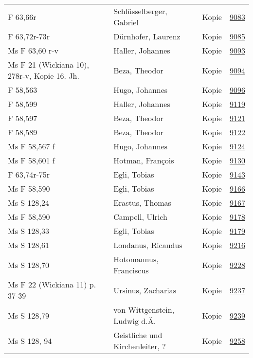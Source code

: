 \documentclass[10pt,a4paper,landscape]{report}
\begin{document}
\begin{longtable}{p{16cm}p{4cm}lr}
F 63,66r	&	Schlüsselberger, Gabriel	&	Kopie	&	\href{http://130.60.24.72/assignment/9083}{9083}\\
F 63,72r-73r	&	Dürnhofer, Laurenz	&	Kopie	&	\href{http://130.60.24.72/assignment/9085}{9085}\\
Ms F 63,60 r-v	&	Haller, Johannes	&	Kopie	&	\href{http://130.60.24.72/assignment/9093}{9093}\\
Ms F 21 (Wickiana 10), 278r-v, Kopie 16. Jh.	&	Beza, Theodor	&	Kopie	&	\href{http://130.60.24.72/assignment/9094}{9094}\\
F 58,563	&	Hugo, Johannes	&	Kopie	&	\href{http://130.60.24.72/assignment/9096}{9096}\\
F 58,599	&	Haller, Johannes	&	Kopie	&	\href{http://130.60.24.72/assignment/9119}{9119}\\
F 58,597	&	Beza, Theodor	&	Kopie	&	\href{http://130.60.24.72/assignment/9121}{9121}\\
F 58,589	&	Beza, Theodor	&	Kopie	&	\href{http://130.60.24.72/assignment/9122}{9122}\\
Ms F 58,567 f	&	Hugo, Johannes	&	Kopie	&	\href{http://130.60.24.72/assignment/9124}{9124}\\
Ms F 58,601 f	&	Hotman, François	&	Kopie	&	\href{http://130.60.24.72/assignment/9130}{9130}\\
F 63,74r-75r	&	Egli, Tobias	&	Kopie	&	\href{http://130.60.24.72/assignment/9143}{9143}\\
Ms F 58,590	&	Egli, Tobias	&	Kopie	&	\href{http://130.60.24.72/assignment/9166}{9166}\\
Ms S 128,24	&	Erastus, Thomas	&	Kopie	&	\href{http://130.60.24.72/assignment/9167}{9167}\\
Ms F 58,590	&	Campell, Ulrich	&	Kopie	&	\href{http://130.60.24.72/assignment/9178}{9178}\\
Ms S 128,33	&	Egli, Tobias	&	Kopie	&	\href{http://130.60.24.72/assignment/9179}{9179}\\
Ms S 128,61	&	Londanus, Ricaudus	&	Kopie	&	\href{http://130.60.24.72/assignment/9216}{9216}\\
Ms S 128,70	&	Hotomannus, Franciscus	&	Kopie	&	\href{http://130.60.24.72/assignment/9228}{9228}\\
Ms F 22 (Wickiana 11) p. 37-39	&	Ursinus, Zacharias	&	Kopie	&	\href{http://130.60.24.72/assignment/9237}{9237}\\
Ms S 128,79	&	von Wittgenstein, Ludwig d.Ä.	&	Kopie	&	\href{http://130.60.24.72/assignment/9239}{9239}\\
Ms S 128, 94	&	Geistliche und Kirchenleiter, ?	&	Kopie	&	\href{http://130.60.24.72/assignment/9258}{9258}\\

\end{longtable}
\end{document}
